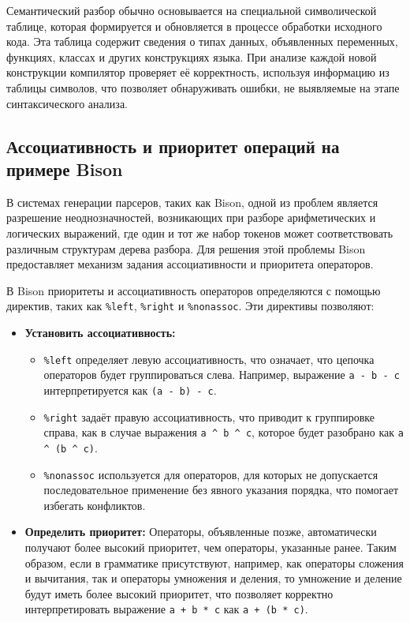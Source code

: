 \documentclass[14pt, russian]{scrartcl}
\begin{document}
Семантический разбор обычно основывается на специальной символической таблице, которая формируется и
обновляется в процессе обработки исходного кода. Эта таблица содержит сведения о типах данных,
объявленных переменных, функциях, классах и других конструкциях языка. При анализе каждой новой
конструкции компилятор проверяет её корректность, используя информацию из таблицы символов, что
позволяет обнаруживать ошибки, не выявляемые на этапе синтаксического анализа.

\subsection{Ассоциативность и приоритет операций на примере Bison}

В системах генерации парсеров, таких как Bison\cite{bison}, одной из проблем является разрешение неоднозначностей,
возникающих при разборе арифметических и логических выражений, где один и тот же набор токенов может
соответствовать различным структурам дерева разбора. Для решения этой проблемы Bison предоставляет механизм
задания ассоциативности и приоритета операторов.

В Bison приоритеты и ассоциативность операторов определяются с помощью директив, таких как
\verb|%left|, \verb|%right| и \verb|%nonassoc|. Эти директивы позволяют:

\begin{itemize}
	\item \textbf{Установить ассоциативность:}
	\begin{itemize}
		 \item \verb|%left| определяет левую ассоциативность, что означает, что цепочка операторов будет
		 группироваться слева. Например, выражение \verb|a - b - c| интерпретируется как \verb|(a - b) - c|.
		 \item \verb|%right| задаёт правую ассоциативность, что приводит к группировке справа, как в случае
		 выражения \verb|a ^ b ^ c|, которое будет разобрано как \verb|a ^ (b ^ c)|.
		 \item \verb|%nonassoc| используется для операторов, для которых не допускается последовательное
		 применение без явного указания порядка, что помогает избегать конфликтов.
	\end{itemize}
	\item \textbf{Определить приоритет:} Операторы, объявленные позже, автоматически получают более высокий
	приоритет, чем операторы, указанные ранее. Таким образом, если в грамматике присутствуют, например,
	как операторы сложения и вычитания, так и операторы умножения и деления, то умножение и деление будут
	иметь более высокий приоритет, что позволяет корректно интерпретировать выражение \verb|a + b * c| как
	\verb|a + (b * c)|.

\end{itemize}
\end{document}
